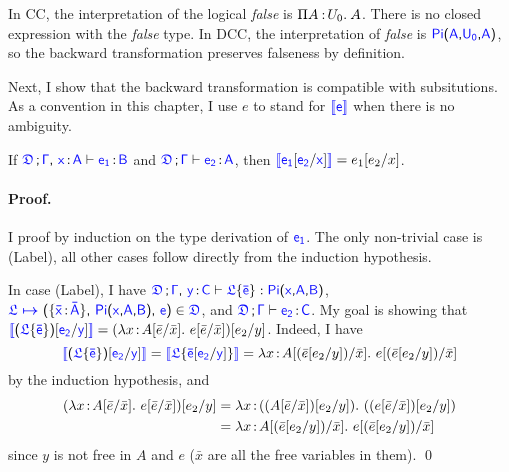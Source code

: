 In CC, the interpretation of the logical \textit{false} is $\Pi A\mkern1.5mu{\hspace{0.5mm}{:}\hspace{0.5mm}} U_0.\hspace{0.8mm}A$. There is no closed expression with the \textit{false} type. In DCC, the interpretation of \textit{false} is $\targetpi{A}{U_0}{A}$, so the backward transformation preserves falseness by definition. 

Next, I show that the backward transformation is compatible with subsitutions. As a convention in this chapter, I use $e$ to stand for $\bluebr{\target{e}}$ when there is no ambiguity.

\begin{lemma} If $\targetcon \sfcomma \itemtype{x}{A} \vdash \itemtype{e_1}{B}$ and $\targetcon \vdash \itemtype{e_2}{A}$, then $\bluebr{\target{e_1}\targetsub{e_2}{x}} = e_1\sub{e_2}{x}$.
\paragraph{Proof.} I proof by induction on the type derivation of $\target{e_1}$. The only non-trivial case is (Label), all other cases follow directly from the induction hypothesis.

In case (Label), I have $\targetcon \sfcomma \itemtype{y}{C} \vdash \targetlab{\flabel}{\bar{e}} : \targetpi{x}{A}{B}$,
$\itemdef{\target{\flabel}}{\itemtype{\bar{x}}{\bar{A}}}{\targetpi{x}{A}{B}}{\target{e}} \in \target{\fdef}$, 
and $\targetcon \vdash \itemtype{e_2}{C}$. My goal is showing that 
$ \bluebr{\sfpl \targetlab{\flabel}{\bar{e}} \sfpr \targetsub{e_2}{y}} = (\lam{x}{A\sub{\bar{e}}{\bar{x}}}{e\sub{\bar{e}}{\bar{x}}})\sub{e_2}{y}$. Indeed, I have
\begin{equation*}
	\bluebr{\sfpl \targetlab{\flabel}{\bar{e}} \sfpr \targetsub{e_2}{y}} = 
	\bluebr{\target{\flabel}\{\target{\bar{e}}\targetsub{e_2}{y}\}}\\
	= \lam{x}{A\sub{(\bar{e}\sub{e_2}{y})}{\bar{x}}}{e\sub{(\bar{e}\sub{e_2}{y})}{\bar{x}}}
\end{equation*}
by the induction hypothesis, and
\begin{align*}
	(\lambda x\hspace{0.5mm}{:}\hspace{0.5mm} A[\bar{e}\slash\bar{x}].\ e[\bar{e}\slash\bar{x}])[e_2\slash y] &= 
	\lambda x\hspace{0.5mm}{:}\hspace{0.5mm}((A[\bar{e}\slash\bar{x}]) [e_2\slash y]).\ ((e[\bar{e}\slash\bar{x}])[e_2\slash y])\\
	&= \lambda x\hspace{0.5mm}{:}\hspace{0.5mm} A[(\bar{e}[e_2\slash y])\slash\bar{x}].\ e[(\bar{e}[e_2\slash y])\slash\bar{x}]
\end{align*}
since $y$ is not free in $A$ and $e$ ($\bar{x}$ are all the free variables in them). \qed
\end{lemma}

